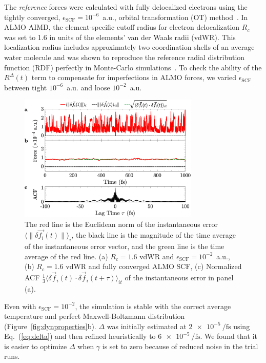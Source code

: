 \documentclass[aip,jcp,reprint,amsmath,amssymb]{revtex4-1}
\begin{document}
The \emph{reference} forces were calculated with fully delocalized electrons using the tightly converged, $\epsilon_{\text{SCF}}=10^{-6}$~a.u., orbital transformation (OT) method~\cite{a:ot}. 
In ALMO AIMD, the element-specific cutoff radius for electron delocalization $R_c$ was set to 1.6 in units of the elements' van der Waals radii (vdWR). This localization radius includes approximately two coordination shells of an average water molecule and was shown to reproduce the reference radial distribution function (RDF) perfectly in Monte-Carlo simulations~\cite{a:almo-ls}. 
%
To check the ability of the $R^{\Delta}(t)$ term to compensate for imperfections in ALMO forces, we varied $\epsilon_{\text{SCF}}$ between tight $10^{-6}$~a.u. and loose $10^{-2}$~a.u. 

\begin{figure}
\includegraphics[trim={0cm 0cm 0cm 0cm},clip,width=8.6cm]{2.eps}
\caption{\label{fig:randomforce} 
The red line is the Euclidean norm of the instantaneous error $\langle \| \delta \vec{f_{i}}(t) \| \rangle_{i}$, the black line is the magnitude of the time average of the instantaneous error vector, and the green line is the time average of the red line. 
(a) $R_{c} = 1.6$ vdWR and $\epsilon_{\text{SCF}} = 10^{-2}$~a.u., 
(b) $R_{c} = 1.6$ vdWR and fully converged ALMO SCF, 
(c) Normalized ACF $\frac{1}{3}\langle \delta \vec{f}_i (t) \cdot \delta\vec{f}_i(t+\tau) \rangle_{it}$ of the instantaneous error in panel (a).
}
\end{figure}

Even with $\epsilon_{\text{SCF}} = 10^{-2}$, the simulation is stable with the correct average temperature and perfect Maxwell-Boltzmann distribution (Figure~\ref{fig:dynproperties}b). $\Delta$ was initially estimated at $\SI{2e-5}{\per\fs}$ using Eq.~(\ref{eq:delta}) and then refined heuristically to $\SI{6e-5}{\per\fs}$. 
We found that it is easier to optimize $\Delta$ when $\gamma$ is set to zero because of reduced noise in the trial runs. 
%
\end{document}
